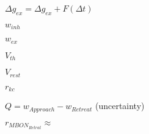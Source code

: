 $\Delta g_{ex} = \Delta g_{ex} + F(\Delta t)$

$w_{inh}$

$w_{ex}$

$V_{th}$

$V_{rest}$

$r_{kc}$

$Q = w_{Approach} - w_{Retreat}$ (uncertainty)


$r_{MBON_{Retrat}} \approx  $